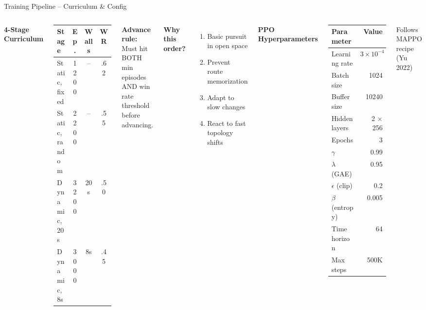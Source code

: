\documentclass[aspectratio=169,11pt]{beamer}
\begin{document}
\begin{frame}{Training Pipeline -- Curriculum \& Config}
\begin{columns}[T]
\textbf{4-Stage Curriculum}
\begin{tabular}{@{}lccc@{}}
\toprule
Stage & Ep. & Walls & WR \\
\midrule
Static, fixed & 1200 & -- & .62 \\
Static, random & 2200 & -- & .55 \\
Dynamic, 20s & 3200 & 20s & .50 \\
Dynamic, 8s & 3000 & 8s & .45 \\
\bottomrule
\end{tabular}

\vspace{6pt}
\textbf{Advance rule:}\\
Must hit BOTH min episodes AND win rate threshold before advancing.

\vspace{6pt}
\textbf{Why this order?}
\begin{enumerate}
\item Basic pursuit in open space
\item Prevent route memorization
\item Adapt to slow changes
\item React to fast topology shifts
\end{enumerate}

\textbf{PPO Hyperparameters}
\begin{tabular}{@{}lr@{}}
\toprule
Parameter & Value \\
\midrule
Learning rate & $3 \times 10^{-4}$ \\
Batch size & 1024 \\
Buffer size & 10240 \\
Hidden layers & 2 $\times$ 256 \\
Epochs & 3 \\
$\gamma$ & 0.99 \\
$\lambda$ (GAE) & 0.95 \\
$\epsilon$ (clip) & 0.2 \\
$\beta$ (entropy) & 0.005 \\
Time horizon & 64 \\
Max steps & 500K \\
\bottomrule
\end{tabular}

\vspace{4pt}
{\small Follows MAPPO recipe (Yu 2022)}
\end{columns}
\end{frame}
\end{document}
